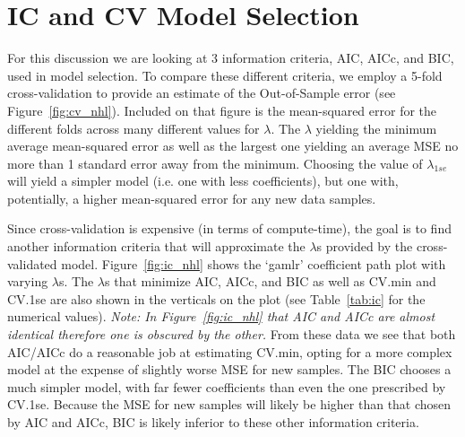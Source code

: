 \documentclass[11pt, fleqn]{article}
\begin{document}
\section{IC and CV Model Selection}

For this discussion we are looking at 3 information criteria, AIC, AICc, and BIC, used in model selection.  To compare these different criteria, we employ a 5-fold cross-validation to provide an estimate of the Out-of-Sample error (see Figure~\vref{fig:cv_nhl}).  Included on that figure is the mean-squared error for the different folds across many different values for $\lambda$.  The $\lambda$ yielding the minimum average mean-squared error as well as the largest one yielding an average MSE no more than 1 standard error away from the minimum.  Choosing the value of $\lambda_{1se}$ will yield a simpler model (i.e. one with less coefficients), but one with, potentially, a higher mean-squared error for any new data samples.

Since cross-validation is expensive (in terms of compute-time), the goal is to find another information criteria that will approximate the $\lambda$s provided by the cross-validated model.  Figure~\ref{fig:ic_nhl} shows the `gamlr' coefficient path plot with varying $\lambda$s.  The $\lambda$s that minimize AIC, AICc, and BIC as well as CV.min and CV.1se are also shown in the verticals on the plot (see Table~\vref{tab:ic} for the numerical values).  \textit{Note: In Figure~\vref{fig:ic_nhl} that AIC and AICc are almost identical therefore one is obscured by the other.}  From these data we see that both AIC/AICc do a reasonable job at estimating CV.min, opting for a more complex model at the expense of slightly worse MSE for new samples.  The BIC chooses a much simpler model, with far fewer coefficients than even the one prescribed by CV.1se.  Because the MSE for new samples will likely be higher than that chosen by AIC and AICc, BIC is likely inferior to these other information criteria.
\end{document}
